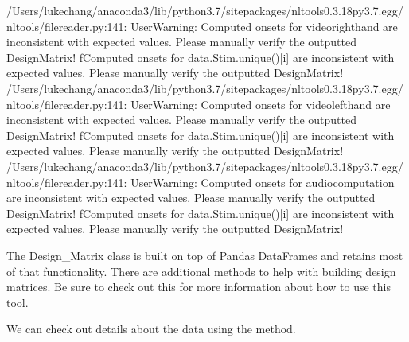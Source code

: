 \documentclass[letterpaper,10pt,english]{sphinxmanual}
\begin{document}
\begin{sphinxVerbatim}[commandchars=\\\{\}]
/Users/lukechang/anaconda3/lib/python3.7/site\PYGZhy{}packages/nltools\PYGZhy{}0.3.18\PYGZhy{}py3.7.egg/nltools/file\PYGZus{}reader.py:141: UserWarning: Computed onsets for video\PYGZus{}right\PYGZus{}hand are inconsistent with expected values. Please manually verify the outputted Design\PYGZus{}Matrix!
  f\PYGZdq{}Computed onsets for \PYGZob{}data.Stim.unique()[i]\PYGZcb{} are inconsistent with expected values. Please manually verify the outputted Design\PYGZus{}Matrix!\PYGZdq{}
/Users/lukechang/anaconda3/lib/python3.7/site\PYGZhy{}packages/nltools\PYGZhy{}0.3.18\PYGZhy{}py3.7.egg/nltools/file\PYGZus{}reader.py:141: UserWarning: Computed onsets for video\PYGZus{}left\PYGZus{}hand are inconsistent with expected values. Please manually verify the outputted Design\PYGZus{}Matrix!
  f\PYGZdq{}Computed onsets for \PYGZob{}data.Stim.unique()[i]\PYGZcb{} are inconsistent with expected values. Please manually verify the outputted Design\PYGZus{}Matrix!\PYGZdq{}
/Users/lukechang/anaconda3/lib/python3.7/site\PYGZhy{}packages/nltools\PYGZhy{}0.3.18\PYGZhy{}py3.7.egg/nltools/file\PYGZus{}reader.py:141: UserWarning: Computed onsets for audio\PYGZus{}computation are inconsistent with expected values. Please manually verify the outputted Design\PYGZus{}Matrix!
  f\PYGZdq{}Computed onsets for \PYGZob{}data.Stim.unique()[i]\PYGZcb{} are inconsistent with expected values. Please manually verify the outputted Design\PYGZus{}Matrix!\PYGZdq{}
\end{sphinxVerbatim}

The Design\_Matrix class is built on top of Pandas DataFrames and retains most of that functionality. There are additional methods to help with building design matrices. Be sure to check out this  for more information about how to use this tool.

We can check out details about the data using the  method.

\begin{sphinxVerbatim}[commandchars=\\\{\}]
\end{sphinxVerbatim}
\end{document}
